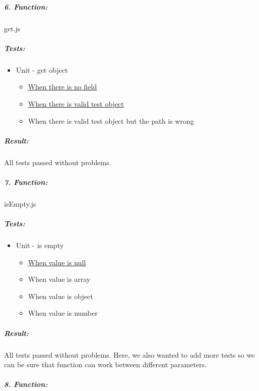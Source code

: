 \documentclass[a4paper, 12pt]{article}
\begin{document}
		\hypertarget{header-n202}{%
		\subparagraph{6. Function:}\label{header-n202}}
		
		get.js
		
		\hypertarget{header-n204}{%
		\subparagraph{Tests:}\label{header-n204}}
		
		\begin{itemize}
		\item
		Unit - get object
		
		\begin{itemize}
			\item
			\underline{When there is no field}
			\item
			\underline{When there is valid test object}
			\item
			When there is valid test object but the path is wrong
		\end{itemize}
		\end{itemize}
		
		\hypertarget{header-n218}{%
		\subparagraph{Result:}\label{header-n218}}
		
		All tests passed without problems.



		\hypertarget{header-n247}{%
		\subparagraph{7. Function:}\label{header-n247}}
		
		isEmpty.js
		
		\hypertarget{header-n249}{%
		\subparagraph{Tests:}\label{header-n249}}
		
		\begin{itemize}
		\item
		Unit - is empty
		
		\begin{itemize}
			\item
			\underline{When value is null}
			\item
			When value is array
			\item
			When value is object
			\item
			When value is number
		\end{itemize}
		\end{itemize}
		
		\hypertarget{header-n260}{%
		\subparagraph{Result:}\label{header-n260}}
		
		All tests passed without problems. Here, we also wanted to add more tests so we can be sure that function can work between different parameters.



		\hypertarget{header-n288}{%
		\subparagraph{8. Function:}\label{header-n288}}
		
\end{document}
